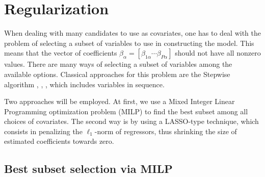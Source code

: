 \section{Regularization}

When dealing with many candidates to use as covariates, one has to deal with the problem of selecting a subset of variables to use in constructing the model. 
This means that the vector of coefficients $\beta_\alpha = [ \beta_{1 \alpha} \cdots \beta_{P\alpha} ]$ should not have all nonzero values.
There are many ways of selecting a subset of variables among the available options.
Classical approaches for this problem are the Stepwise algorithm \cite{efroymson1960multiple}, \cite{hocking_selection_1967}, \cite{tibshirani1996regression}, which includes variables in sequence. 

Two approaches will be employed. At first, we use a Mixed Integer Linear Programming optimization problem (MILP) to find the best subset among all choices of covariates. The second way is by using a LASSO-type technique, which consists in penalizing the $\ell_1$-norm of regressors, thus shrinking the size of estimated coefficients towards zero.  

\subsection{Best subset selection via MILP}
\label{sec:best-subset-mip}

